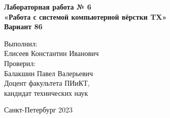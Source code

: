 \pagestyle{fancy}

\vspace*{10cm}
\begin{center}
	\LARGE\textbf
	{Лабораторная работа № 6\\
	«Работа с системой
	компьютерной вёрстки TX»\\
	Вариант 86}
\end{center}
\vspace*{4cm}
\begin{flushright}
	\Large
	{Выполнил:\\
	Елисеев Константин Иванович\\
	\vspace{1cm}
	Проверил:\\
	Балакшин Павел Валерьевич\\
	Доцент факультета ПИиКТ,\\ кандидат технических наук\\}
\begin{center}
    \vspace*{4cm}
    \large{Санкт-Петербург 2023}
\end{center}
\end{flushright}